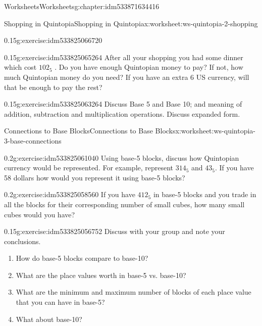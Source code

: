 \documentclass[twoside,11pt,]{book}
\begin{document}
\begin{chapterptx}{Worksheets}{}{Worksheets}{}{}{g:chapter:idm533871634416}
\begin{worksheet-section-numberless}{Shopping in Quintopia}{}{Shopping in Quintopia}{}{}{x:worksheet:ws-quintopia-2-shopping}
\begin{divisionexercise}{4}{}{0.15}{g:exercise:idm533825066720}
\end{divisionexercise}%
\begin{divisionexercise}{5}{}{0.15}{g:exercise:idm533825065264}%
After all your shopping you had some dinner which cost \(102_{5}\) . Do you have enough Quintopian money to pay? If not, how much Quintopian money do you need?  If you have an extra \textdollar{}6 US currency, will that be enough to pay the rest?%
\end{divisionexercise}%
\begin{divisionexercise}{6}{}{0.15}{g:exercise:idm533825063264}%
Discuss Base 5 and Base 10; and meaning of addition, subtraction and multiplication operations. Discuss expanded form.%
\end{divisionexercise}%
\end{worksheet-section-numberless}
\restoregeometry
%
%
\typeout{************************************************}
\typeout{************************************************}
%
\begin{worksheet-section-numberless}{Connections to Base Blocks}{}{Connections to Base Blocks}{}{}{x:worksheet:ws-quintopia-3-base-connections}
\begin{divisionexercise}{1}{}{0.2}{g:exercise:idm533825061040}%
Using base-5 blocks, discuss how Quintopian currency would be represented. For example, represent \(314_{5}\) and \(43_{5}\). If you have \textdollar{}58 dollars how would you represent it using base-5 blocks?%
\end{divisionexercise}%
\begin{divisionexercise}{2}{}{0.2}{g:exercise:idm533825058560}%
If you have \(412_{5}\) in base-5 blocks and you trade in all the blocks for their corresponding number of small cubes, how many small cubes would you have?%
\end{divisionexercise}%
\begin{divisionexercise}{3}{}{0.15}{g:exercise:idm533825056752}%
Discuss with your group and note your conclusions.%
%
\begin{enumerate}[label=(\alph*)]
\item{}How do base-5 blocks compare to base-10?%
\item{}What are the place values worth in base-5 vs. base-10?%
\item{}What are the minimum and maximum number of blocks of each place value that you can have in base-5?%
\item{}What about base-10?%

\end{enumerate}
\end{divisionexercise}
\end{worksheet-section-numberless}
\end{chapterptx}
\end{document}
